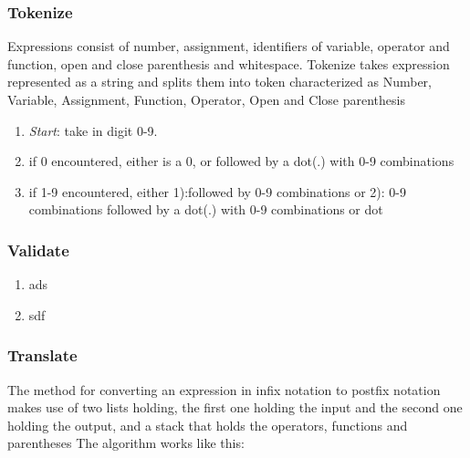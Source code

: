 \documentclass[12pt,a4paper]{article}
\begin{document}
\subsubsection{Tokenize}
\textnormal{Expressions consist of number, assignment, identifiers of variable, operator and function, open and close parenthesis and whitespace. Tokenize takes expression represented as a string and splits them into token characterized as Number, Variable, Assignment, Function, Operator, Open and Close parenthesis}
\begin {enumerate}
\item \emph{Start}: take in digit 0-9.
\item if 0 encountered, either is a 0, or followed by a dot(.) with 0-9 combinations
\item if 1-9 encountered, either 1):followed by 0-9 combinations or 2): 0-9 combinations followed by a dot(.) with 0-9 combinations or dot
\end{enumerate}

\subsubsection{Validate}
\begin {enumerate}
\item ads
\item sdf
\end{enumerate}

\subsubsection{Translate}
\textnormal{The method for converting an expression in infix notation to postfix notation makes use of two lists holding, the first one holding the input and the second one holding the output, and a stack that holds the operators, functions and parentheses \newline \newline The algorithm works like this:}
\end{document}
